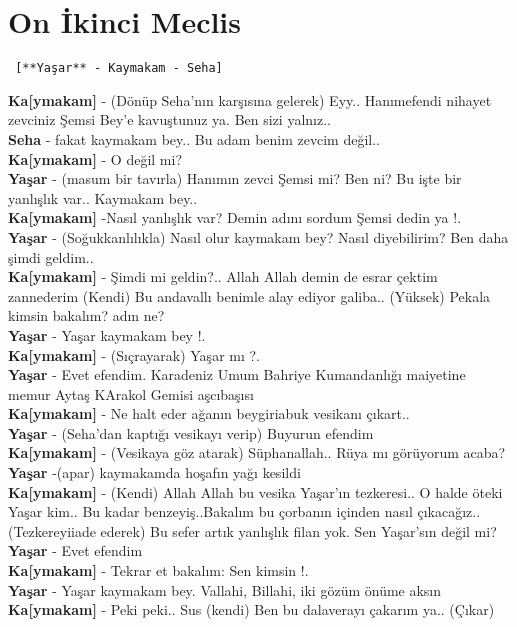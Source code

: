 \documentclass[]{book}
\begin{document}
\hypertarget{on-ikinci-meclis-2}{%
\section{On İkinci Meclis}\label{on-ikinci-meclis-2}}

\begin{verbatim}
 [**Yaşar** - Kaymakam - Seha]
\end{verbatim}

\textbf{Ka{[}ymakam{]}} - (Dönüp Seha'nın karşısına gelerek) Eyy.. Hanımefendi nihayet zevciniz Şemsi Bey'e kavuştunuz ya. Ben sizi yalnız..\\
\textbf{Seha} - fakat kaymakam bey.. Bu adam benim zevcim değil..\\
\textbf{Ka{[}ymakam{]}} - O değil mi?\\
\textbf{Yaşar} - (masum bir tavırla) Hanımın zevci Şemsi mi? Ben ni? Bu işte bir yanlışlık var.. Kaymakam bey..\\
\textbf{Ka{[}ymakam{]}} -Nasıl yanlışlık var? Demin adını sordum Şemsi dedin ya !.\\
\textbf{Yaşar} - (Soğukkanlılıkla) Nasıl olur kaymakam bey? Nasıl diyebilirim? Ben daha şimdi geldim..\\
\textbf{Ka{[}ymakam{]}} - Şimdi mi geldin?.. Allah Allah demin de esrar çektim zannederim (Kendi) Bu andavallı benimle alay ediyor galiba.. (Yüksek) Pekala kimsin bakalım? adın ne?\\
\textbf{Yaşar} - Yaşar kaymakam bey !.\\
\textbf{Ka{[}ymakam{]}} - (Sıçrayarak) Yaşar mı ?.\\
\textbf{Yaşar} - Evet efendim. Karadeniz Umum Bahriye Kumandanlığı maiyetine memur Aytaş KArakol Gemisi aşcıbaşısı\\
\textbf{Ka{[}ymakam{]}} - Ne halt eder ağanın beygiriabuk vesikanı çıkart..\\
\textbf{Yaşar} - (Seha'dan kaptığı vesikayı verip) Buyurun efendim\\
\textbf{Ka{[}ymakam{]}} - (Vesikaya göz atarak) Süphanallah.. Rüya mı görüyorum acaba?\\
\textbf{Yaşar} -(apar) kaymakamda hoşafın yağı kesildi\\
\textbf{Ka{[}ymakam{]}} - (Kendi) Allah Allah bu vesika Yaşar'ın tezkeresi.. O halde öteki Yaşar kim.. Bu kadar benzeyiş..Bakalım bu çorbanın içinden nasıl çıkacağız..(Tezkereyiiade ederek) Bu sefer artık yanlışlık filan yok. Sen Yaşar'sın değil mi?\\
\textbf{Yaşar} - Evet efendim\\
\textbf{Ka{[}ymakam{]}} - Tekrar et bakalım: Sen kimsin !.\\
\textbf{Yaşar} - Yaşar kaymakam bey. Vallahi, Billahi, iki gözüm önüme aksın\\
\textbf{Ka{[}ymakam{]}} - Peki peki.. Sus (kendi) Ben bu dalaverayı çakarım ya.. (Çıkar)\\
\end{document}
